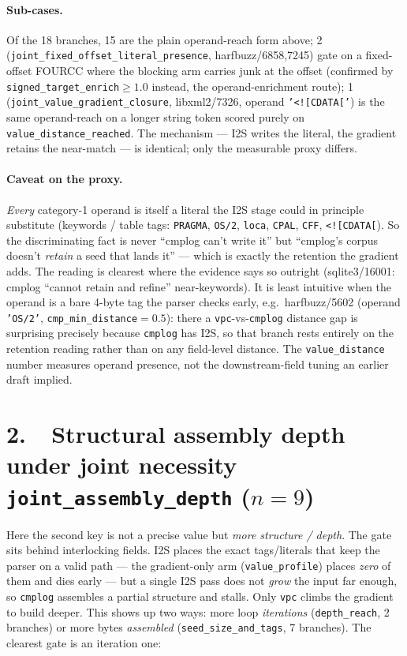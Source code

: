 \documentclass[11pt]{article}
\begin{document}
\paragraph{Sub-cases.} Of the 18 branches, 15 are the plain operand-reach form
above; 2 (\texttt{joint\_fixed\_offset\_literal\_presence}, harfbuzz/6858,7245)
gate on a fixed-offset FOURCC where the blocking arm carries junk at the offset
(confirmed by \texttt{signed\_target\_enrich}$\ge 1.0$ instead, the
operand-enrichment route); 1 (\texttt{joint\_value\_gradient\_closure},
libxml2/7326, operand \texttt{'<![CDATA['}) is the same operand-reach on a longer
string token scored purely on \texttt{value\_distance\_reached}. The mechanism ---
I2S writes the literal, the gradient retains the near-match --- is identical; only
the measurable proxy differs.

\paragraph{Caveat on the proxy.} \emph{Every} category-1 operand is itself a
literal the I2S stage could in principle substitute (keywords / table tags:
\texttt{PRAGMA}, \texttt{OS/2}, \texttt{loca}, \texttt{CPAL}, \texttt{CFF},
\texttt{<![CDATA[}). So the discriminating fact is never ``cmplog can't write
it'' but ``cmplog's corpus doesn't \emph{retain} a seed that lands it'' --- which
is exactly the retention the gradient adds. The reading is clearest where the
evidence says so outright (sqlite3/16001: cmplog ``cannot retain and refine''
near-keywords). It is least intuitive when the operand is a bare 4-byte tag the
parser checks early, e.g.\ \mbox{harfbuzz/5602} (operand \texttt{'OS/2'},
\texttt{cmp\_min\_distance}$=0.5$): there a \texttt{vpc}-vs-\texttt{cmplog}
distance gap is surprising precisely because \texttt{cmplog} has I2S, so that
branch rests entirely on the retention reading rather than on any field-level
distance. The \texttt{value\_distance} number measures operand presence, not the
downstream-field tuning an earlier draft implied.

\section*{2.\ \ Structural assembly depth under joint necessity \hfill {\normalsize\texttt{joint\_assembly\_depth} ($n=9$)}}
Here the second key is not a precise value but \emph{more structure / depth}. The
gate sits behind interlocking fields. I2S places the exact tags/literals that keep
the parser on a valid path --- the gradient-only arm (\texttt{value\_profile})
places \emph{zero} of them and dies early --- but a single I2S pass does not
\emph{grow} the input far enough, so \texttt{cmplog} assembles a partial structure
and stalls. Only \texttt{vpc} climbs the gradient to build deeper. This shows up two
ways: more loop \emph{iterations} (\texttt{depth\_reach}, 2 branches) or more bytes
\emph{assembled} (\texttt{seed\_size\_and\_tags}, 7 branches). The clearest gate is an
iteration one:
\end{document}
